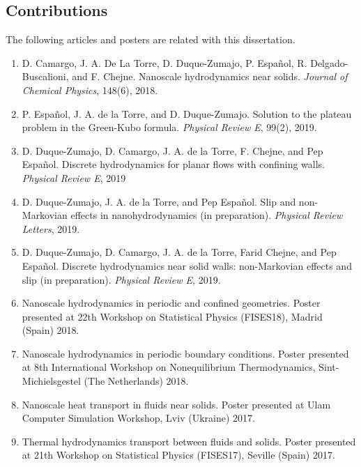 \documentclass[b5paper,openright,10pt]{book}
\begin{document}
\pagestyle{Contents}




\begin{appendices}
\chapter{Contributions}\label{Ap:Contributions}
\pagestyle{noHeader}
The following articles and posters are related with this dissertation.
\begin{enumerate}
  \item \cite{Camargo2018} D. Camargo, J. A. De La Torre, D. Duque-Zumajo, P. Español, R. Delgado-Buscalioni, and F. Chejne. Nanoscale hydrodynamics near solids. \textit{Journal of Chemical Physics}, 148(6), 2018.
  \item \cite{Espanol2019e} P. Español, J. A. de la Torre, and D. Duque-Zumajo. Solution to the plateau problem in the Green-Kubo formula. \textit{Physical Review E}, 99(2), 2019.
  \item \cite{Discrete1} D. Duque-Zumajo, D. Camargo, J. A. de la Torre, F. Chejne, and Pep Español. Discrete hydrodynamics for planar flows with confining walls. \textit{Physical Review E}, 2019
  \item \cite{PRL} D. Duque-Zumajo, J. A. de la Torre, and Pep Español. Slip and non-Markovian effects in nanohydrodynamics (in preparation). \textit{Physical Review Letters}, 2019. 
  \item \cite{Markovian} D. Duque-Zumajo, D. Camargo, J. A. de la Torre, Farid Chejne, and Pep Español. Discrete hydrodynamics near solid walls: non-Markovian effects and slip (in preparation). \textit{Physical Review E}, 2019. 
  \item \cite{FISESMadrid} Nanoscale hydrodynamics in periodic and confined geometries. Poster presented at 22th Workshop on Statistical Physics (FISES18), Madrid (Spain) 2018.
  \item \cite{IWNET} Nanoscale hydrodynamics in periodic boundary conditions. Poster presented at 8th International Workshop on Nonequilibrium Thermodynamics, Sint-Michielsgestel (The Netherlands) 2018.
  \item \cite{Ulam} Nanoscale heat transport in fluids near solids. Poster presented at Ulam Computer Simulation Workshop, Lviv (Ukraine) 2017.
  \item \cite{FISESSevilla} Thermal hydrodynamics transport between fluids and solids. Poster presented at 21th Workshop on Statistical Physics (FISES17), Seville (Spain) 2017.
  \end{enumerate}


\end{appendices}
\end{document}
